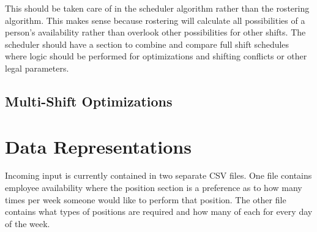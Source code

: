 \documentclass[a4paper,11pt]{article}
\begin{document}
This should be taken care of in the scheduler algorithm rather than the rostering algorithm.
This makes sense because rostering will calculate all possibilities of a person's availability rather than overlook other possibilities for other shifts.
The scheduler should have a section to combine and compare full shift schedules where logic should be performed for optimizations and shifting conflicts or other legal parameters.

\subsection{Multi-Shift Optimizations}

\section{Data Representations}

Incoming input is currently contained in two separate CSV files. 
One file contains employee availability where the position section is a preference as to how many times per week someone would like to perform that position. The other file contains what types of positions are required and how many of each for every day of the week.
\end{document}
